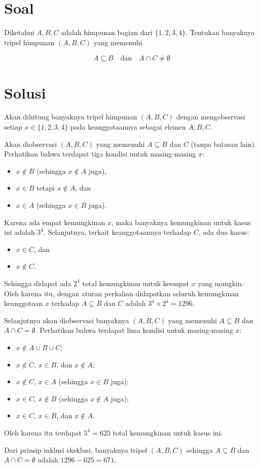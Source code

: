
\section{Soal}
Diketahui \( A, B, C \) adalah himpunan bagian dari \(\{1, 2, 3, 4\}\). Tentukan banyaknya tripel himpunan \((A, B, C)\) yang memenuhi  

\[
A \subseteq B \quad \text{dan} \quad A \cap C \neq \emptyset
\]

\newpage
\section{Solusi}
    \begin{solusi}
    Akan dihitung banyaknya tripel himpunan $(A,B,C)$ dengan mengobservasi setiap $x \in \{1,2,3,4\}$ pada keanggotaannya sebagai elemen $A,B,C$. 
    
    Akan diobservasi $(A,B,C)$ yang memenuhi $A \subseteq B$ dan $C$ (tanpa batasan lain). Perhatikan bahwa terdapat tiga kondisi untuk masing-masing $x$:
    \begin{itemize}
        \item $x \not \in B$ (sehingga $x \not \in A$ juga),
        \item $x \in B$ tetapi $x \not \in A$, dan
        \item $x \in A$ (sehingga $x \in B$ juga).
    \end{itemize}
    Karena ada empat kemungkinan $x$, maka banyaknya kemungkinan untuk kasus ini adalah $3^4$. Selanjutnya, terkait keanggotaannya terhadap $C$, ada dua kasus:
    \begin{itemize}
        \item $x \in C$, dan
        \item $x \not \in C$.
    \end{itemize}
    Sehingga didapat ada $2^4$ total kemungkinan  untuk keempat $x$ yang mungkin. 
    Oleh karena itu, dengan aturan perkalian didapatkan seluruh kemungkinan keanggotaan $x$ terhadap $A \subseteq B$ dan $C$ adalah $3^4 \times 2^4 = 1296$.

    Selanjutnya akan diobservasi banyaknya $(A,B,C)$ yang memenuhi $A \subseteq B$ dan $A \cap C = \emptyset$. Perhatikan bahwa terdapat lima kondisi untuk masing-masing $x$:
    \begin{itemize}
        \item $x \not \in A \cup B \cup C$;
        \item $x \not \in C$, $x \in B$, dan $x \not \in A$;
        \item $x \not \in C$, $x \in A$ (sehingga $x \in B$ juga);
        \item $x \in C$, $x \not \in B$ (sehingga $x \not \in A$ juga);
        \item $x \in C$, $x \in B$, dan $x \not \in A$.
    \end{itemize}
    Oleh karena itu terdapat $5^4 = 625$ total kemungkinan untuk kasus ini.

    Dari prinsip inklusi eksklusi, banyaknya tripel $(A,B,C)$ sehingga $A \subseteq B$ dan $A \cap C = \emptyset$ adalah $1296 - 625 = \boxed{671}$.
\end{solusi}

    

